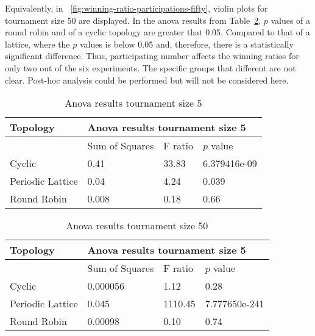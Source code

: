 Equivalently, in ~\ref{fig:winning-ratio-participations-fifty}, violin plots for
tournament size 50 are displayed.  In the anova results from Table~\ref{anova-size-fifty},
\(p\) values of a round robin and of a cyclic topology are greater that 0.05.
Compared to that of a lattice, where the \(p\) values is below 0.05 and, therefore,
there is a statistically significant difference.
Thus, participating number affects the winning ratios for only two out of the six
experiments. The specific groups that different are not clear.
Post-hoc analysis could be performed but will not be considered here.

\begin{table}[H]
\centering
\begin{adjustbox}{width=0.5\textwidth}
\small
\begin{tabular}{|l|l|l|l|}
\hline
Topology         & \multicolumn{3}{l|}{Anova results tournament size 5} \\ \hline
                 & Sum of Squares      & F ratio     & \(p\) value          \\ \hline
Cyclic           & 0.41                & 33.83       & 6.379416e-09     \\ \hline
Periodic Lattice & 0.04                & 4.24        & 0.039            \\ \hline
Round Robin      & 0.008               & 0.18        & 0.66             \\ \hline
\end{tabular}
\end{adjustbox}
\caption{Anova results tournament size 5}
\label{anova-size-five}
\end{table}

\begin{table}[H]
\centering
\begin{adjustbox}{width=0.5\textwidth}
\small
\begin{tabular}{|l|l|l|l|}
\hline
Topology         & \multicolumn{3}{l|}{Anova results tournament size 5} \\ \hline
                 & Sum of Squares     & F ratio     & \(p\) value           \\ \hline
Cyclic           & 0.000056           & 1.12        & 0.28              \\ \hline
Periodic Lattice & 0.045              & 1110.45     & 7.777650e-241     \\ \hline
Round Robin      & 0.00098            & 0.10        & 0.74              \\ \hline
\end{tabular}
\end{adjustbox}
\caption{Anova results tournament size 50}
\label{anova-size-fifty}
\end{table}

